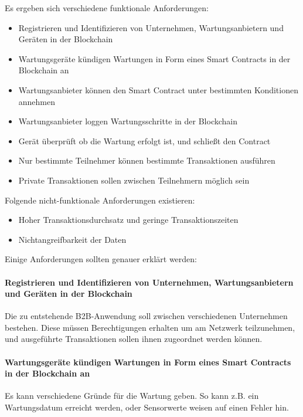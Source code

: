 Es ergeben sich verschiedene funktionale Anforderungen:
\begin{itemize}
    \item Registrieren und Identifizieren von Unternehmen, Wartungsanbietern und Geräten in der Blockchain
    \item Wartungsgeräte kündigen Wartungen in Form eines Smart Contracts in der Blockchain an
    \item Wartungsanbieter können den Smart Contract unter bestimmten Konditionen annehmen
    \item Wartungsanbieter loggen Wartungsschritte in der Blockchain
    \item Gerät überprüft ob die Wartung erfolgt ist, und schließt den Contract
    \item Nur bestimmte Teilnehmer können bestimmte Transaktionen ausführen
    \item Private Transaktionen sollen zwischen Teilnehmern möglich sein
\end{itemize}

Folgende nicht-funktionale Anforderungen existieren:

\begin{itemize}
    \item Hoher Transaktionsdurchsatz und geringe Transaktionszeiten
    \item Nichtangreifbarkeit der Daten
\end{itemize}

Einige Anforderungen sollten genauer erklärt werden:

\paragraph{Registrieren und Identifizieren von Unternehmen, Wartungsanbietern und Geräten in der Blockchain}
Die zu entstehende B2B-Anwendung soll zwischen verschiedenen Unternehmen bestehen. Diese müssen Berechtigungen erhalten um am Netzwerk teilzunehmen, und ausgeführte Transaktionen sollen ihnen zugeordnet werden können.

\paragraph{Wartungsgeräte kündigen Wartungen in Form eines Smart Contracts in der Blockchain an}
Es kann verschiedene Gründe für die Wartung geben. So kann z.B. ein Wartungsdatum erreicht werden, oder Sensorwerte weisen auf einen Fehler hin.

